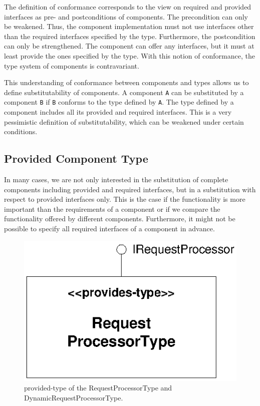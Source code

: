 The definition of conformance corresponds to the view on required and provided
interfaces as pre- and postconditions of components. The precondition can only
be weakened. Thus, the component implementation must not use interfaces other
than the required interfaces specified by the type. Furthermore, the
postcondition can only be strengthened. The component can offer any interfaces,
but it must at least provide the ones specified by the type. With this notion of
conformance, the type system of components is contravariant.

This understanding of conformance between components and types allows us to
define substitutability of components. A component \texttt{A} can be substituted
by a component \texttt{B} if \texttt{B} conforms to the type defined by
\texttt{A}. The type defined by a component includes all its provided and
required interfaces. This is a very pessimistic definition of substitutability,
which can be weakened under certain conditions. 

\subsection*{Provided Component Type}

In many cases, we are not only interested in the substitution of complete
components including provided and required interfaces, but in a substitution
with respect to provided interfaces only. This is the case if the functionality
is more important than the requirements of a component or if we compare the
functionality offered by different components. Furthermore, it might not be
possible to specify all required interfaces of a component in advance. 

\begin{figure}[htbp]
\centering
\includegraphics[scale=0.85]{example/ProvidesType}
\caption{provided-type of the RequestProcessorType and
DynamicRequestProcessorType.}
\label{fig:ProvidesType}
\end{figure}


